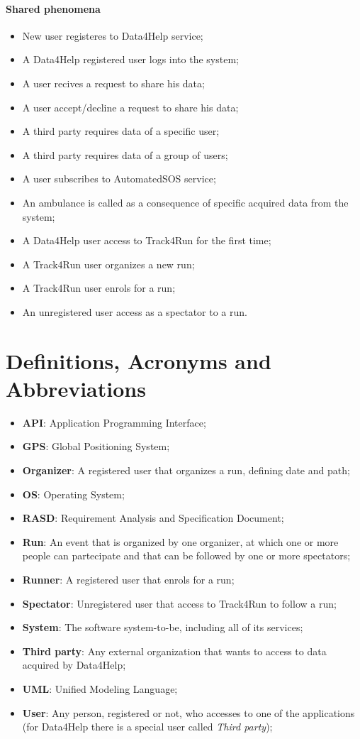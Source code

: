 \paragraph{Shared phenomena}
\begin{itemize}
  \item New user registeres to Data4Help service;
  \item A Data4Help registered user logs into the system;
  \item A user recives a request to share his data;
  \item A user accept/decline a request to share his data;
  \item A third party requires data of a specific user;
  \item A third party requires data of a group of users;
  \item A user subscribes to AutomatedSOS service;
  \item An ambulance is called as a consequence of specific acquired data from the system;
  \item A Data4Help user access to Track4Run for the first time;
  \item A Track4Run user organizes a new run;
  \item A Track4Run user enrols for a run;
  \item An unregistered user access as a spectator to a run.
\end{itemize}
\section{Definitions, Acronyms and Abbreviations}
\begin{itemize}
  \setlength{\itemindent}{-.4in}
  \item[] \textbf{API}: Application Programming Interface;
  \item[] \textbf{GPS}: Global Positioning System;
  \item[] \textbf{Organizer}: A registered user that organizes a run, defining date and path;
  \item[] \textbf{OS}: Operating System;
  \item[] \textbf{RASD}: Requirement Analysis and Specification Document;
  \item[] \textbf{Run}: An event that is organized by one organizer, at which one or more people can partecipate and that can be followed by one or more spectators;
  \item[] \textbf{Runner}: A registered user that enrols for a run;
  \item[] \textbf{Spectator}: Unregistered user that access to Track4Run to follow a run;
  \item[] \textbf{System}: The software system-to-be, including all of its services;
  \item[] \textbf{Third party}: Any external organization that wants to access to data acquired by Data4Help;
  \item[] \textbf{UML}: Unified Modeling Language;
  \item[] \textbf{User}: Any person, registered or not, who accesses to one of the applications (for Data4Help there is a special user called \textit{Third party});
\end{itemize}
